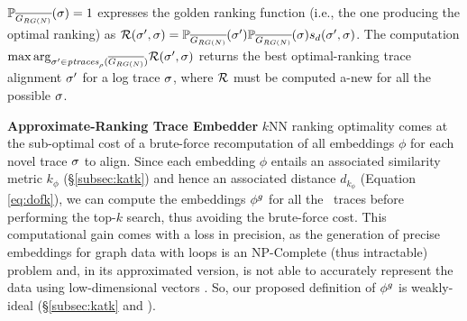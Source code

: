 {$\probskip{\logtrace}=1$ expresses the golden ranking function (i.e., the one producing the optimal ranking) as $\goldenrank(\nonlogtrace,\logtrace)=\probskip{\nonlogtrace} \probskip{\logtrace} s_d(\nonlogtrace,\logtrace)$. The computation ${\max\arg}_{\nonlogtrace\in \WCal{\pmin}{n}} \goldenrank(\nonlogtrace, {\logtrace})$ returns the best optimal-ranking trace alignment $\nonlogtrace$ for a log trace $\logtrace$, where $\goldenrank$ must be computed a-new for all the possible $\logtrace$.
	
	
	
\noindent
\textbf{Approximate-Ranking Trace Embedder}\label{subsec:ate}
$k$NN ranking optimality comes at the sub-optimal cost of a brute-force recomputation of all embeddings $\phi$ 
for each novel trace $\logtrace$ to align. 
Since each embedding $\phi$ entails an associated similarity metric $k_\phi$ (\S\ref{subsec:katk}) and hence an associated 
distance $d_{k_\phi}$ (Equation \ref{eq:dofk}), we can compute the embeddings $\gorgembed$ for all the \unravelled\ traces 
before performing the top-$k$ search, thus avoiding the brute-force cost. This computational gain comes with a loss in precision, as the generation of precise embeddings for graph data with loops is an NP-Complete (thus intractable) problem \cite{GartnerFW03} and, in its approximated version, is not able to accurately represent the data using low-dimensional vectors \cite{Seshadhri5631}. So, our proposed definition of $\gorgembed$ is  weakly-ideal (\S\ref{subsec:katk} and \cite{Gartner03}).

}
